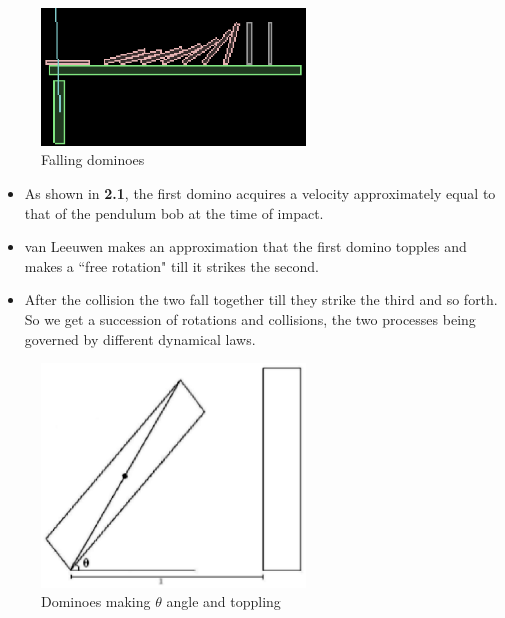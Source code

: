 \documentclass[11pt]{article}
\begin{document}
\begin{figure}[h!]
\caption{Falling dominoes}
\centering
\includegraphics[width=7cm]{dominoes}
\end{figure}

\begin{itemize}
	\item As shown in \textbf{2.1}, the first domino acquires a velocity approximately equal to that of the pendulum bob at the time of impact.
	\item van Leeuwen \cite{DominoEff} makes an approximation that the first domino topples and makes a ``free rotation" till it strikes the second.
	\item After the collision the two fall together till they strike the
	      third and so forth. So we get a succession of rotations and collisions, the two processes
	      being governed by different dynamical laws.
\end{itemize}

\begin{figure}[h!]
\caption{Dominoes making $\theta$ angle and toppling}
\centering
\includegraphics[width=7cm]{domin}
\end{figure}
\end{document}
